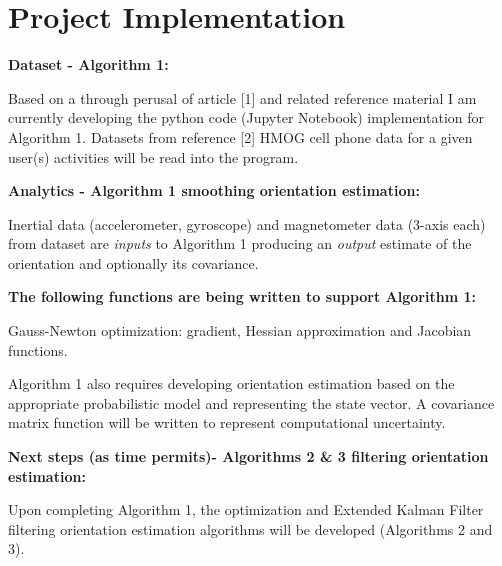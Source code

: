 \documentclass{article}
\begin{document}
\section{Project Implementation}

\textbf{Dataset - Algorithm 1:}

Based on a through perusal of article [1] and related reference material I am currently developing the python code (Jupyter Notebook) implementation for Algorithm 1. Datasets from reference [2] HMOG cell phone data for a given user(s) activities will be read into the program.

\textbf{Analytics - Algorithm 1 smoothing orientation estimation:}

Inertial data (accelerometer, gyroscope) and magnetometer data (3-axis each) from dataset are \textit{inputs} to Algorithm 1 producing an \textit{output} estimate of the orientation and optionally its covariance.

\textbf{The following functions are being written to support Algorithm 1:}

Gauss-Newton optimization: gradient, Hessian approximation and Jacobian functions.

Algorithm 1 also requires developing orientation estimation based on the appropriate probabilistic model and representing the state vector. A covariance matrix function will be written to represent computational uncertainty.

\textbf{Next steps (as time permits)- Algorithms 2 \& 3 filtering orientation estimation:}

Upon completing Algorithm 1, the optimization and Extended Kalman Filter filtering orientation estimation algorithms will be developed (Algorithms 2 and 3).



\end{document}
